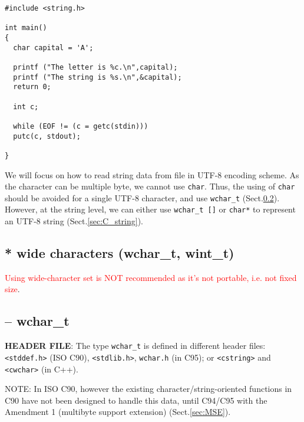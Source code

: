 \begin{Verbatim}
#include <string.h>

int main()
{
  char capital = 'A';

  printf ("The letter is %c.\n",capital);
  printf ("The string is %s.\n",&capital);
  return 0;

  int c;

  while (EOF != (c = getc(stdin)))
  putc(c, stdout);

}
\end{Verbatim}

We will focus on how to read string data from file in UTF-8 encoding scheme. As
the character can be multiple byte, we cannot use \verb!char!. Thus, the using
of \verb!char! should be avoided for a single UTF-8 character, and use
\verb!wchar_t! (Sect.\ref{sec:wchar_t}).
However, at the string level, we can either use \verb!wchar_t []! or
\verb!char*! to represent an UTF-8 string (Sect.\ref{sec:C_string}).


\subsection{* wide characters (wchar\_t, wint\_t)}
\label{sec:character_wide}

\textcolor{red}{Using wide-character set is NOT recommended as it's not
portable, i.e. not fixed size}. 

\subsection{-- wchar\_t}
\label{sec:wchar_t}

{\bf HEADER FILE}: 
The type
\verb!wchar_t! is defined in different header files: \verb!<stddef.h>! (ISO
C90), \verb!<stdlib.h>!, \verb!wchar.h! (in C95); or \verb!<cstring>! and
\verb!<cwchar>! (in C++).

NOTE: In ISO C90, however the existing character/string-oriented functions in
C90 have not been designed to handle this data, until C94/C95 with the Amendment
1 (multibyte support extension) (Sect.\ref{sec:MSE}).


